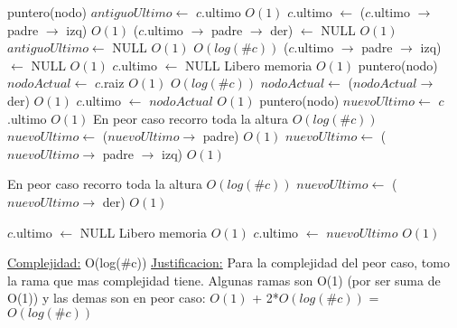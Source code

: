 \begin{Algoritmos}
\begin{algorithm}[H]
\begin{algorithmic}[1]
        \State puntero(nodo) $antiguoUltimo \gets$ $c$.ultimo \Comment $O(1)$
        \State $c$.ultimo $\gets$ ($c$.ultimo $\to$ padre $\to$ izq) \Comment $O(1)$
        \State ($c$.ultimo $\to$ padre $\to$ der) $\gets$ NULL \Comment $O(1)$
        \State $antiguoUltimo \gets$ NULL \Comment $O(1)$
    \Else
         \Comment $O(log(\#c))$
            \State ($c$.ultimo $\to$ padre $\to$ izq) $\gets$ NULL \Comment $O(1)$
            \State $c$.ultimo $\gets$ NULL \Comment Libero memoria $O(1)$
            \State puntero(nodo) $nodoActual \gets$ $c$.raiz \Comment $O(1)$
             \Comment $O(log(\#c))$
            \State $nodoActual \gets$ ($nodoActual \to$ der) \Comment $O(1)$
            \EndWhile
            \State $c$.ultimo $\gets$ $nodoActual$ \Comment $O(1)$
        \Else
            \State puntero(nodo) $nuevoUltimo \gets$ $c$.ultimo \Comment $O(1)$
              \Comment En peor caso recorro toda la altura $O(log(\#c))$
                \State $nuevoUltimo \gets$ ($nuevoUltimo \to$ padre) \Comment $O(1)$  
            \EndWhile
            \State $nuevoUltimo \gets$ ($nuevoUltimo \to$ padre $\to$ izq)  \Comment $O(1)$

              \Comment En peor caso recorro toda la altura  $O(log(\#c))$
                \State $nuevoUltimo \gets$ ($nuevoUltimo \to$ der) \Comment $O(1)$  
            \EndWhile

            \State $c$.ultimo $\gets$ NULL \Comment Libero memoria $O(1)$
            \State $c$.ultimo $\gets$ $nuevoUltimo$ \Comment $O(1)$

        \EndIf


    \EndIf

    \EndIf

    \medskip
    \Statex \underline{Complejidad:} O(log($\#$c))
    \Statex \underline{Justificacion:} Para la complejidad del peor caso, tomo la rama que mas complejidad tiene. Algunas ramas son O(1) (por ser suma de O(1)) y las demas son en peor caso: $O(1)$ + 2*$O(log(\#c))$ = $O(log(\#c))$

\end{algorithmic}
\end{algorithm}

$ $\newline



\end{Algoritmos}
